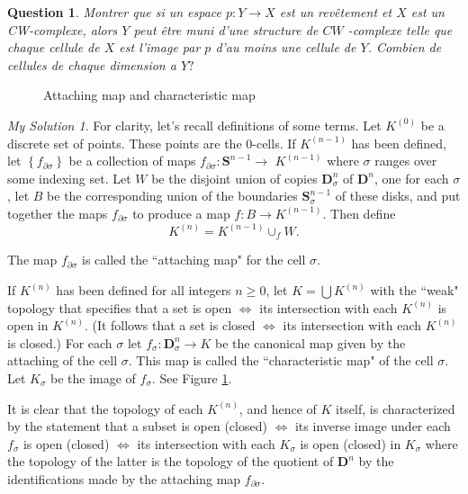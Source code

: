 \documentclass[]{article}
\newtheorem{prop}{Question}
\theoremstyle{remark}
\newtheorem*{sol}{My Solution}
\begin{document}
\begin{prop}
	Montrer que si un espace $p: Y \rightarrow X$ est un revêtement et $X$ est un CW-complexe, alors $Y$ peut être muni d'une structure de $C W$ -complexe telle que chaque cellule de $X$ est l'image par $p$ d'au moins une cellule de $Y$. Combien de cellules de chaque dimension a $Y ?$
\end{prop}
\begin{figure}
	\centering
	\def\svgwidth{\columnwidth}
	
	\caption{Attaching map and characteristic map}
	\label{fig:characteristic_map}
\end{figure}
\begin{sol}
	For clarity, let's recall definitions of some terms. Let $K^{(0)}$ be a discrete set of points. These points are the $ 0  $-cells. If $K^{(n-1)}$ has been defined, let $\left\{f_{\partial \sigma}\right\}$ be a collection of maps $f_{\partial \sigma}: \mathbf{S}^{n-1} \rightarrow$ $K^{(n-1)}$ where $\sigma$ ranges over some indexing set. Let $W$ be the disjoint union of copies $\mathbf{D}_{\sigma}^{n}$ of $\mathbf{D}^{n}$, one for each $\sigma$, let $B$ be the corresponding union of the boundaries $\mathbf{S}_{\sigma}^{n-1}$ of these disks, and put together the maps $f_{\partial \sigma}$ to produce a map $f: B \rightarrow K^{(n-1)}$. Then define \[ K^{(n)}=K^{(n-1)} \cup_{f} W. \]
	
	The map $f_{\partial \sigma}$ is called the ``attaching map" for the cell $\sigma$.
	
	If $K^{(n)}$ has been defined for all integers $n \geq 0$, let $K=\bigcup K^{(n)}$ with the ``weak" topology that specifies that a set is open $\Leftrightarrow$ its intersection with each $K^{(n)}$ is open in $K^{(n)} .$ (It follows that a set is closed $\Leftrightarrow$ its intersection with each $K^{(n)}$ is closed.)
	For each $\sigma$ let $f_{\sigma}: \mathbf{D}_{\sigma}^{n} \rightarrow K$ be the canonical map given by the attaching of the cell $\sigma$. This map is called the ``characteristic map" of the cell $\sigma$. Let $K_{\sigma}$ be the image of $f_{\sigma} .$ See Figure \ref{fig:characteristic_map}.
	
	It is clear that the topology of each $K^{(n)}$, and hence of $K$ itself, is characterized by the statement that a subset is open (closed) $\Leftrightarrow$ its inverse image under each $f_{\sigma}$ is open (closed) $\Leftrightarrow$ its intersection with each $K_{\sigma}$ is open (closed) in $K_{\sigma}$ where the topology of the latter is the topology of the quotient of $\mathbf{D}^{n}$ by the identifications made by the attaching map $f_{\partial \sigma} .$ 
	

\end{sol}
\end{document}
